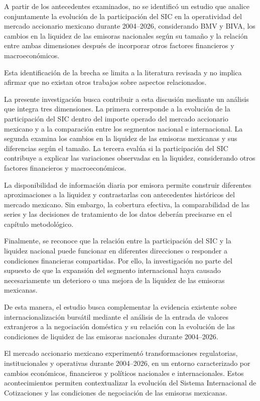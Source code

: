 A partir de los antecedentes examinados, no se identificó un estudio que analice conjuntamente la evolución de la participación del SIC en la operatividad del mercado accionario mexicano durante 2004--2026, considerando BMV y BIVA, los cambios en la liquidez de las emisoras nacionales según su tamaño y la relación entre ambas dimensiones después de incorporar otros factores financieros y macroeconómicos.

Esta identificación de la brecha se limita a la literatura revisada y no implica afirmar que no existan otros trabajos sobre aspectos relacionados.

La presente investigación busca contribuir a esta discusión mediante un análisis que integra tres dimensiones. La primera corresponde a la evolución de la participación del SIC dentro del importe operado del mercado accionario mexicano y a la comparación entre los segmentos nacional e internacional. La segunda examina los cambios en la liquidez de las emisoras mexicanas y sus diferencias según el tamaño. La tercera evalúa si la participación del SIC contribuye a explicar las variaciones observadas en la liquidez, considerando otros factores financieros y macroeconómicos.

La disponibilidad de información diaria por emisora permite construir diferentes aproximaciones a la liquidez y contrastarlas con antecedentes históricos del mercado mexicano. Sin embargo, la cobertura efectiva, la comparabilidad de las series y las decisiones de tratamiento de los datos deberán precisarse en el capítulo metodológico.

Finalmente, se reconoce que la relación entre la participación del SIC y la liquidez nacional puede funcionar en diferentes direcciones o responder a condiciones financieras compartidas. Por ello, la investigación no parte del supuesto de que la expansión del segmento internacional haya causado necesariamente un deterioro o una mejora de la liquidez de las emisoras mexicanas.

De esta manera, el estudio busca complementar la evidencia existente sobre internacionalización bursátil mediante el análisis de la entrada de valores extranjeros a la negociación doméstica y su relación con la evolución de las condiciones de liquidez de las emisoras nacionales durante 2004--2026.


El mercado accionario mexicano experimentó transformaciones regulatorias, institucionales y operativas durante 2004--2026, en un entorno caracterizado por cambios económicos, financieros y políticos nacionales e internacionales. Estos acontecimientos permiten contextualizar la evolución del Sistema Internacional de Cotizaciones y las condiciones de negociación de las emisoras mexicanas.

